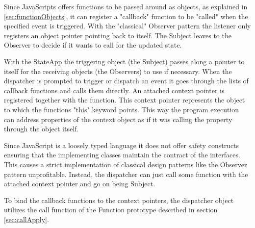 \documentclass[english]{ifimaster}
\begin{document}
Since JavaScripts offers functions to be passed around as objects, as explained in \ref{sec:functionObjects}, it can register a "callback" function to be "called" when the specified event is triggered. With the "classical" Observer pattern the listener only registers an object pointer pointing back to itself. The Subject leaves to the Observer to decide if it wants to call for the updated state.

With the StateApp the triggering object (the Subject) passes along a pointer to itself for the receiving objects (the Observers) to use if necessary. When the dispatcher is prompted to trigger or dispatch an event it goes through the lists of callback functions and calls them directly. An attached context pointer is registered together with the function. This context pointer represents the object to which the functions "this" keyword points. This way the program execution can address properties of the context object as if it was calling the property through the object itself. 

Since JavaScript is a loosely typed language it does not offer safety constructs ensuring that the implementing classes maintain the contract of the interfaces. This causes a strict implementation of classical design patterns like the Observer pattern unprofitable. Instead, the dispatcher can just call some function with the attached context pointer and go on being Subject. 

To bind the callback functions to the context pointers, the dispatcher object utilizes the call function of the Function prototype described in section \ref{sec:callApply}.


 
\end{document}
